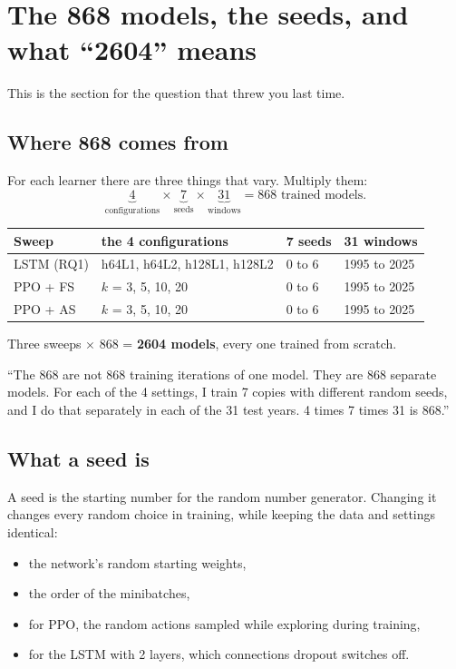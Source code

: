 \documentclass[11pt,a4paper]{article}
\begin{document}
\section{The 868 models, the seeds, and what ``2604'' means}

This is the section for the question that threw you last time.

\subsection{Where 868 comes from}

For each learner there are three things that vary. Multiply them:
\[
\underbrace{4}_{\text{configurations}} \times \underbrace{7}_{\text{seeds}} \times
\underbrace{31}_{\text{windows}} = 868 \text{ trained models.}
\]

\begin{center}
\begin{tabular}{llll}
\toprule
Sweep & the 4 configurations & 7 seeds & 31 windows \\
\midrule
LSTM (RQ1) & h64L1, h64L2, h128L1, h128L2 & 0 to 6 & 1995 to 2025 \\
PPO + FS & $k$ = 3, 5, 10, 20 & 0 to 6 & 1995 to 2025 \\
PPO + AS & $k$ = 3, 5, 10, 20 & 0 to 6 & 1995 to 2025 \\
\bottomrule
\end{tabular}
\end{center}

Three sweeps $\times$ 868 = \textbf{2604 models}, every one trained from scratch.

\begin{sayit}
``The 868 are not 868 training iterations of one model. They are 868 separate models. For
each of the 4 settings, I train 7 copies with different random seeds, and I do that
separately in each of the 31 test years. 4 times 7 times 31 is 868.''
\end{sayit}

\subsection{What a seed is}

A seed is the starting number for the random number generator. Changing it changes every
random choice in training, while keeping the data and settings identical:
\begin{itemize}
  \item the network's random starting weights,
  \item the order of the minibatches,
  \item for PPO, the random actions sampled while exploring during training,
  \item for the LSTM with 2 layers, which connections dropout switches off.
\end{itemize}
\end{document}
